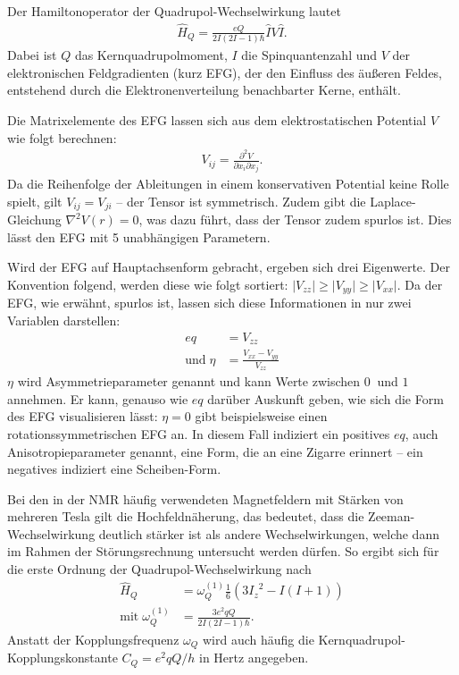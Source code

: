 Der Hamiltonoperator der Quadrupol-Wechselwirkung lautet \cite[S. 208]{levitt}
\begin{align}
	\hat{H}_Q = \frac{eQ}{2I (2I - 1) \hbar} \hat{I} V \hat{I}.
\end{align}
Dabei ist $Q$ das Kernquadrupolmoment, $I$ die Spinquantenzahl und $V$ der elektronischen Feldgradienten (kurz EFG), der den Einfluss des äußeren Feldes, entstehend durch die Elektronenverteilung benachbarter Kerne, enthält.

Die Matrixelemente des EFG lassen sich aus dem elektrostatischen Potential $V$ wie folgt berechnen:
\begin{align}
	V_{ij} = \frac{\partial^2 V}{\partial x_i \partial x_j}.
\end{align}
Da die Reihenfolge der Ableitungen in einem konservativen Potential keine Rolle spielt, gilt $V_{ij} = V_{ji}$ -- der Tensor ist symmetrisch. Zudem gibt die Laplace-Gleichung $\nabla^2 V(r) = 0$, was dazu führt, dass der Tensor zudem spurlos ist. Dies lässt den EFG mit 5 unabhängigen Parametern.

Wird der EFG auf Hauptachsenform gebracht, ergeben sich drei Eigenwerte. Der Konvention folgend, werden diese wie folgt sortiert: $\lvert V_{zz} \rvert \ge \lvert V_{yy} \rvert \ge \lvert V_{xx} \rvert$. Da der EFG, wie erwähnt, spurlos ist, lassen sich diese Informationen in nur zwei Variablen darstellen:
\begin{align}
	eq                & = V_{zz}                         \\
	\text{und}\; \eta & = \frac{V_{xx} - V_{yy}}{V_{zz}}
\end{align}
$\eta$ wird Asymmetrieparameter genannt und kann Werte zwischen $\SI{0}{}$ und $\SI{1}{}$ annehmen. Er kann, genauso wie $eq$ darüber Auskunft geben, wie sich die Form des EFG visualisieren lässt: $\eta = 0$ gibt beispielsweise einen rotationssymmetrischen EFG an. In diesem Fall indiziert ein positives $eq$, auch Anisotropieparameter genannt, eine Form, die an eine Zigarre erinnert -- ein negatives indiziert eine Scheiben-Form.

Bei den in der NMR häufig verwendeten Magnetfeldern mit Stärken von mehreren Tesla gilt die Hochfeldnäherung, das bedeutet, dass die Zeeman-Wechselwirkung deutlich stärker ist als andere Wechselwirkungen, welche dann im Rahmen der Störungsrechnung untersucht werden dürfen. So ergibt sich für die erste Ordnung der Quadrupol-Wechselwirkung nach \cite[S. 209]{levitt}
\begin{align}
	\hat{H}_Q                   & = \omega_Q^{(1)} \frac{1}{6} \left( 3 {I_z}^2 - I(I + 1) \right) \\
	\text{mit}\; \omega_Q^{(1)} & = \frac{3e^2qQ}{2I(2I - 1) \hbar}.
\end{align}
Anstatt der Kopplungsfrequenz $\omega_Q$ wird auch häufig die Kern\-quad\-ru\-pol-Kopp\-lungs\-kon\-stan\-te $C_Q = e^2qQ / h$ in Hertz angegeben.

